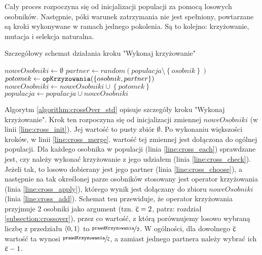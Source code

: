 \documentclass[./FM_mgr.tex]{subfiles}
\begin{document}
Cały proces rozpoczyna się od inicjalizacji populacji za pomocą losowych osobników. Następnie, póki warunek zatrzymania nie jest spełniony, powtarzane są kroki wykonywane w ramach jednego pokolenia. Są to kolejno: krzyżowanie, mutacja i selekcja naturalna.

\begin{algorithm}[h]
	\caption{Szczegółowy schemat działania kroku "Wykonaj krzyżowanie"	\label{algorithm:crossOver_std}}
	\begin{algorithmic}[1]
		\Start
		\Var $noweOsobniki \gets \emptyset$
		\label{line:cross_init} 
		\label{line:cross_each} 
		\label{line:cross_check} 
		\Var $partner \gets random(populacja \setminus \left\{ osobnik \right\})$ 
		\label{line:cross_choose}
		\Var $potomek \gets \mathtt{opKrzyzowania}(\{ osobnik, partner \})$
		\label{line:cross_apply} 
		\State $noweOsobniki \gets noweOsobniki \cup \left\{ potomek \right\}$
		\label{line:cross_add}
		\EndIf 
		\EndFor
		\State $populacja \gets populacja \cup noweOsobniki$ 
		\label{line:cross_merge}
		\EndProcedure
	\end{algorithmic}
\end{algorithm}

Algorytm \ref{algorithm:crossOver_std} opisuje szczegóły kroku "Wykonaj krzyżowanie". Krok ten rozpoczyna się od inicjalizacji zmiennej $noweOsobniki$ (w linii \ref{line:cross_init}).
Jej wartość to pusty zbiór $\emptyset$.
Po wykonaniu większości kroków, w linii \ref{line:cross_merge}. wartość tej zmiennej jest dołączona do ogólnej populacji. 
Dla każdego osobnika w populacji (linia \ref{line:cross_each}) sprawdzane jest, czy należy wykonać krzyżowanie z jego udziałem (linia \ref{line:cross_check}). 
Jeżeli tak, to losowo dobierany jest jego partner (linia \ref{line:cross_choose}), a następnie na tak określonej parze osobników stosowany jest operator krzyżowania (linia \ref{line:cross_apply}), którego wynik jest dołączany do zbioru $noweOsobniki$ (linia \ref{line:cross_add}). Schemat ten przewiduje, że operator krzyżowania przyjmuje 2 osobniki jako argument (tzn. $\mathsf{\overline{c}} = 2$, patrz: rozdział \ref{subsection:crossover}), przez co wartość, z którą porównujemy losowo wybraną liczbę z przedziału $\langle0, 1\rangle$ to $\nicefrac{\mathtt{prawdKrzyzowania}}{2}$. W ogólności, dla dowolnego $\mathsf{\overline{c}}$ wartość ta wynosi $\nicefrac{\mathtt{prawdKrzyzowania}}{\mathsf{\overline{c}}}$, a zamiast jednego partnera należy wybrać ich $\mathsf{\overline{c}}-1$.
\end{document}
